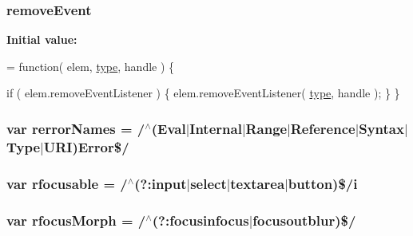 \subsubsection[{\texorpdfstring{remove\+Event}{removeEvent}}]{ remove\+Event}\hypertarget{jquery-3_82_81_8js_aa1c5d81df6a0efc8b733d7df6f1faffd}{}\label{jquery-3_82_81_8js_aa1c5d81df6a0efc8b733d7df6f1faffd}
{\bfseries Initial value\+:}
\begin{DoxyCode}
= \textcolor{keyword}{function}( elem, \hyperlink{jquery-3_82_81_8js_a4c4533b7d49de290bb8cccd4e6f43349}{type}, handle ) \{

    
    \textcolor{keywordflow}{if} ( elem.removeEventListener ) \{
        elem.removeEventListener( \hyperlink{jquery-3_82_81_8js_a4c4533b7d49de290bb8cccd4e6f43349}{type}, handle );
    \}
\}
\end{DoxyCode}
\subsubsection[{\texorpdfstring{rerror\+Names}{rerrorNames}}]{\setlength{\rightskip}{0pt plus 5cm}var rerror\+Names = /$^\wedge$(Eval$\vert$Internal$\vert$Range$\vert$Reference$\vert$Syntax$\vert$Type$\vert$U\+RI)Error\$/}\hypertarget{jquery-3_82_81_8js_a7c436c95688c6936f28388d5b3712ed0}{}\label{jquery-3_82_81_8js_a7c436c95688c6936f28388d5b3712ed0}
\subsubsection[{\texorpdfstring{rfocusable}{rfocusable}}]{\setlength{\rightskip}{0pt plus 5cm}var rfocusable = /$^\wedge$(?\+:{\bf input}$\vert$select$\vert$textarea$\vert$button)\$/i}\hypertarget{jquery-3_82_81_8js_aab28558121608d235bdedacb5809bcb9}{}\label{jquery-3_82_81_8js_aab28558121608d235bdedacb5809bcb9}
\subsubsection[{\texorpdfstring{rfocus\+Morph}{rfocusMorph}}]{\setlength{\rightskip}{0pt plus 5cm}var rfocus\+Morph = /$^\wedge$(?\+:focusinfocus$\vert$focusoutblur)\$/}\hypertarget{jquery-3_82_81_8js_a315b370e4b940df20b4b4299c89c064e}{}\label{jquery-3_82_81_8js_a315b370e4b940df20b4b4299c89c064e}
